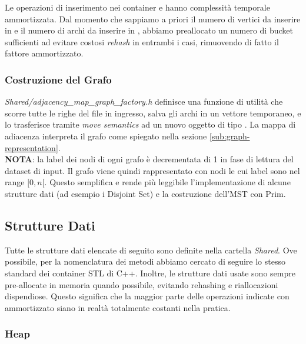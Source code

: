 \noindent Le operazioni di inserimento nei container  e  hanno complessità temporale \complexityConstant{} ammortizzata. Dal momento che sappiamo a priori il numero di vertici da inserire in  e il numero di archi da inserire in , abbiamo preallocato un numero di bucket sufficienti ad evitare costosi \textit{rehash} in entrambi i casi, rimuovendo di fatto il fattore ammortizzato.

\subsubsection {Costruzione del Grafo}

\textit{Shared/adjacency\_map\_graph\_factory.h} definisce una funzione di utilità che scorre tutte le righe del file in ingresso, salva gli archi in un vettore temporaneo, e lo trasferisce tramite \textit{move semantics} ad un nuovo oggetto di tipo . La mappa di adiacenza interpreta il grafo come spiegato nella sezione \ref{sub:graph-representation}. \\

\noindent \textbf{NOTA}: la label dei nodi di ogni grafo è decrementata di 1 in fase di lettura del dataset di input. Il grafo viene quindi rappresentato con nodi le cui label sono nel range $[0, n[$.
Questo semplifica e rende più leggibile l'implementazione di alcune strutture dati (ad esempio i Disjoint Set) e la costruzione dell'MST con Prim.

\subsection{Strutture Dati}

Tutte le strutture dati elencate di seguito sono definite nella cartella \textit{Shared}.
Ove possibile, per la nomenclatura dei metodi abbiamo cercato di seguire lo stesso standard dei container STL di C++.
Inoltre, le strutture dati usate sono sempre pre-allocate in memoria quando possibile, evitando rehashing e riallocazioni dispendiose. Questo significa che la maggior parte delle operazioni indicate con \complexityConstant{} ammortizzato siano in realtà totalmente costanti nella pratica.

\subsubsection{Heap}

